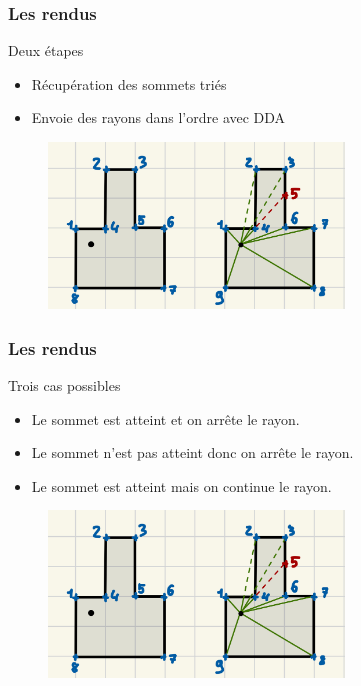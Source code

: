 \documentclass{beamer}
\begin{document}
\begin{frame}
    \frametitle{Les rendus}
    \begin{block}{Deux étapes}
        \begin{itemize}
            \item Récupération des sommets triés 
            \item Envoie des rayons dans l'ordre avec DDA
        \end{itemize}
    \end{block}
    \begin{figure}
        \centering
        \includegraphics[width=0.7\textwidth]{images/envoie-rayon-ordre.jpg}
    \end{figure}
\end{frame}

\begin{frame}
    \frametitle{Les rendus}
    \begin{block}{Trois cas possibles}
        \begin{itemize}
            \item Le sommet est atteint et on arrête le rayon. 
            \item Le sommet n'est pas atteint donc on arrête le rayon.
            \item Le sommet est atteint mais on continue le rayon.
        \end{itemize}
    \end{block}
    \begin{figure}
        \centering
        \includegraphics[width=0.7\textwidth]{images/envoie-rayon-ordre.jpg}
    \end{figure}
\end{frame}
\end{document}
